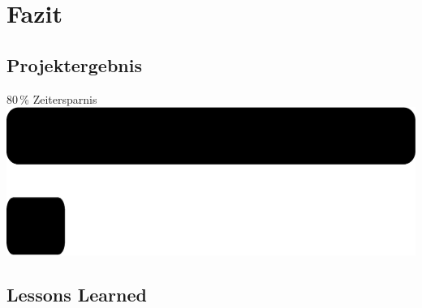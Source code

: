 \section{Fazit}
\subsection{Projektergebnis}
\begin{frame}{80\,\% Zeitersparnis}
\includegraphics[width=\textwidth]{Balken}
\end{frame}
\subsection{Lessons Learned}
\begin{frame}{}

\end{frame}

{ %
\frame[plain]{}
} 



